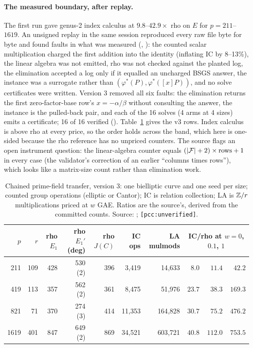 \paragraph{The measured boundary, after replay.} The first run gave
genus-2 index calculus at $9.8$--$42.9\times$ rho on $E$ for $p=211$--$1619$.
An unsigned replay in the same session reproduced every raw file byte for
byte and found faults in what was measured
(,
): the counted
scalar multiplication charged the first addition into the identity
(inflating IC by 8--13\%), the linear algebra was not emitted, rho was not
checked against the planted log, the elimination accepted a log only if it
equalled an uncharged BSGS answer, the instance was a surrogate rather than
$(\varphi^*(P),\varphi^*([x]P))$, and no solve certificates were written.
Version 3 removed all six faults: the elimination returns the first
zero-factor-base row's $x=-\alpha/\beta$ without consulting the answer, the
instance is the pulled-back pair, and each of the 16 solves (4 arms at 4
sizes) emits a certificate; 16 of 16 verified
().
Table~\ref{tab:jac-chain-v3} gives the v3 rows. Index calculus is above rho
at every price, so the order holds across the band, which here is
one-sided because the rho reference has no unpriced counters. The source
flags an open instrument question: the linear-algebra counter equals
$(\lvert \mathcal{F} \rvert+2)\times\text{rows}+1$ in every case (the validator's correction
of an earlier ``columns times rows''), which looks like a matrix-size count
rather than elimination work.

\begin{table}[t]
\centering\footnotesize
\begin{tabular}{@{}rrrrrrrrrr@{}}
\toprule
$p$ & $r$ & rho $E_1$ & rho $E_1'$ (deg) & rho $J(C)$ & IC ops & LA mulmods & \multicolumn{3}{c}{IC/rho at $w=0$, $0.1$, $1$} \\
\midrule
211 & 109 & 428 & 530 (2) & 396 & 3{,}419 & 14{,}633 & $8.0$ & $11.4$ & $42.2$ \\
419 & 113 & 357 & 562 (2) & 361 & 8{,}475 & 51{,}976 & $23.7$ & $38.3$ & $169.3$ \\
821 & 71 & 370 & 274 (3) & 414 & 11{,}353 & 164{,}828 & $30.7$ & $75.2$ & $476.2$ \\
1619 & 401 & 847 & 649 (2) & 869 & 34{,}521 & 603{,}721 & $40.8$ & $112.0$ & $753.5$ \\
\bottomrule
\end{tabular}
\caption[]{Chained prime-field transfer, version 3: one bielliptic curve
and one seed per size; counted group operations (elliptic or Cantor);
IC is relation collection; LA is $\mathbb{Z}/r$ multiplications priced at $w$
GAE. Ratios are the source's, derived from the committed counts. Source:
;
\texttt{[pcc:unverified]}.}
\label{tab:jac-chain-v3}
\end{table}

